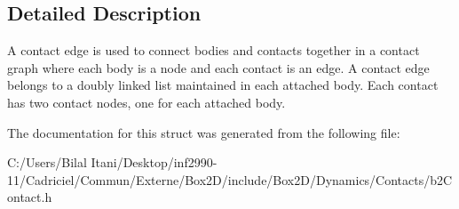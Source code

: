 \subsection{Detailed Description}
A contact edge is used to connect bodies and contacts together in a contact graph where each body is a node and each contact is an edge. A contact edge belongs to a doubly linked list maintained in each attached body. Each contact has two contact nodes, one for each attached body. 

The documentation for this struct was generated from the following file\+:\begin{DoxyCompactItemize}
\item 
C\+:/\+Users/\+Bilal Itani/\+Desktop/inf2990-\/11/\+Cadriciel/\+Commun/\+Externe/\+Box2\+D/include/\+Box2\+D/\+Dynamics/\+Contacts/b2\+Contact.\+h\end{DoxyCompactItemize}
